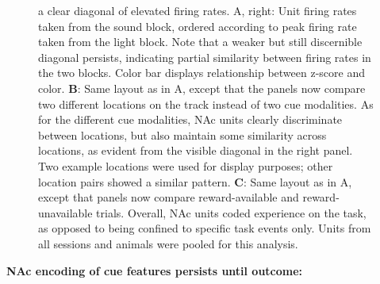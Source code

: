 \documentclass[11pt]{article}
\newcommand{\bsf}[1]{\textbf{#1}}
\providecommand{\DIFadd}[1]{{\protect\color{red} \sf #1}} %
\providecommand{\DIFdel}[1]{} %
\providecommand{\DIFaddbegin}{} %
\providecommand{\DIFaddend}{} %
\providecommand{\DIFdelbegin}{} %
\providecommand{\DIFdelend}{} %
\providecommand{\DIFaddFL}[1]{\DIFadd{#1}} %
\providecommand{\DIFdelFL}[1]{\DIFdel{#1}} %
\providecommand{\DIFaddbeginFL}{} %
\providecommand{\DIFaddendFL}{} %
\providecommand{\DIFdelbeginFL}{} %
\providecommand{\DIFdelendFL}{} %
\newcommand{\DIFscaledelfig}{0.5}
\newlength{\DIFdelgraphicswidth} %
\newlength{\DIFdelgraphicsheight} %
\newcommand{\DIFaddincludegraphics}[2][]{{\color{red}\fbox{\DIFOincludegraphics[#1]{#2}}}} %
\newcommand{\DIFdelincludegraphics}[2][]{%
\sbox{\DIFdelgraphicsbox}{\DIFOincludegraphics[#1]{#2}}%
\settoboxwidth{\DIFdelgraphicswidth}{\DIFdelgraphicsbox} %
\settoboxtotalheight{\DIFdelgraphicsheight}{\DIFdelgraphicsbox} %
\scalebox{\DIFscaledelfig}{%
\parbox[b]{\DIFdelgraphicswidth}{\usebox{\DIFdelgraphicsbox}\\[-\baselineskip] \rule{\DIFdelgraphicswidth}{0em}}\llap{\resizebox{\DIFdelgraphicswidth}{\DIFdelgraphicsheight}{%
\setlength{\unitlength}{\DIFdelgraphicswidth}%
\begin{picture}(1,1)%
\thicklines\linethickness{2pt} %
{\color[rgb]{1,0,0}\put(0,0){\framebox(1,1){}}}%
{\color[rgb]{1,0,0}\put(0,0){\line( 1,1){1}}}%
{\color[rgb]{1,0,0}\put(0,1){\line(1,-1){1}}}%
\end{picture}%
}\hspace*{3pt}}} %
} %
\DeclareRobustCommand{\DIFaddbegin}{\DIFOaddbegin \let\includegraphics\DIFaddincludegraphics} %
\DeclareRobustCommand{\DIFaddend}{\DIFOaddend \let\includegraphics\DIFOincludegraphics} %
\DeclareRobustCommand{\DIFdelbegin}{\DIFOdelbegin \let\includegraphics\DIFdelincludegraphics} %
\DeclareRobustCommand{\DIFdelend}{\DIFOaddend \let\includegraphics\DIFOincludegraphics} %
\DeclareRobustCommand{\DIFaddbeginFL}{\DIFOaddbeginFL \let\includegraphics\DIFaddincludegraphics} %
\DeclareRobustCommand{\DIFaddendFL}{\DIFOaddendFL \let\includegraphics\DIFOincludegraphics} %
\DeclareRobustCommand{\DIFdelbeginFL}{\DIFOdelbeginFL \let\includegraphics\DIFdelincludegraphics} %
\DeclareRobustCommand{\DIFdelendFL}{\DIFOaddendFL \let\includegraphics\DIFOincludegraphics} %
\begin{document}
\begin{figure}[ht!]
{a clear diagonal of elevated firing rates. A, right: Unit firing rates
taken from the sound block, ordered according to peak firing rate taken from
the light block. Note that a weaker but still discernible diagonal persists,
indicating partial similarity between firing rates in the two blocks. \DIFdelbeginFL \DIFdelFL{A similar pattern exists for within-block comparisons suggesting that reordering any two sets of trials
produces this partial similarity, however correlations within blocks are more
similar than correlations across blocks (see text)}\DIFdelendFL \DIFaddbeginFL \DIFaddFL{Color bar displays relationship between z-score and color}\DIFaddendFL . \bsf{B}: Same layout as in
A, except that the panels now compare two different locations on the track
instead of two cue modalities. As for the different cue modalities, NAc units
clearly discriminate between locations, but also maintain some similarity
across locations, as evident from the visible diagonal in the right panel. Two
example locations were used for display purposes; other location pairs showed
a similar pattern. \bsf{C}: Same layout as in A, except that panels now
compare reward-available and reward-unavailable trials. \DIFdelbeginFL \DIFdelFL{\bsf{D-F}: Heat plots
aligned to normalized minimum firing rates. \bsf{D}: Responses during
different stimulus blocks as in A, but with units ordered according to the
time of their minimum firing rate. \bsf{E}: Responses during trials on
different arms as in B, but with units ordered by their minimum firing
rate. \bsf{F}: Responses during cues signalling different outcomes as in C,
but with units ordered by their minimum firing rate. }\DIFdelendFL Overall, NAc units
\DIFdelbeginFL \DIFdelFL{"tiled" }\DIFdelendFL \DIFaddbeginFL \DIFaddFL{coded }\DIFaddendFL experience on the task, as opposed to being confined to specific task
events only. Units from all sessions and animals were pooled for this
analysis.}
\label{fig:tiling}
\end{figure} \clearpage

{\bf \DIFdelbegin \DIFdel{Encoding }\DIFdelend \DIFaddbegin \DIFadd{NAc encoding }\DIFaddend of cue features persists until outcome:}
\end{document}
